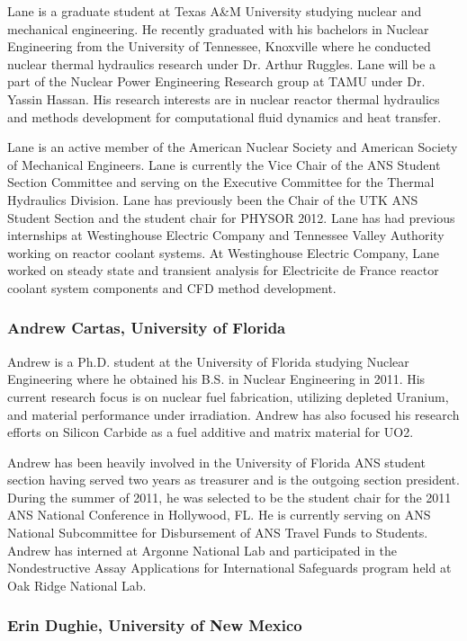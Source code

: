 Lane is a graduate student at Texas A\&M University studying nuclear and
mechanical engineering. He recently graduated with his bachelors in Nuclear
Engineering from the University of Tennessee, Knoxville where he conducted
nuclear thermal hydraulics research under Dr. Arthur Ruggles. Lane will be a
part of the Nuclear Power Engineering Research group at TAMU under Dr. Yassin
Hassan. His research interests are in nuclear reactor thermal hydraulics and
methods development for computational fluid dynamics and heat transfer.

Lane is an active member of the American Nuclear Society and American Society of
Mechanical Engineers. Lane is currently the Vice Chair of the ANS Student
Section Committee and serving on the Executive Committee for the Thermal
Hydraulics Division. Lane has previously been the Chair of the UTK ANS Student
Section and the student chair for PHYSOR 2012. Lane has had previous internships
at Westinghouse Electric Company and Tennessee Valley Authority working on
reactor coolant systems. At Westinghouse Electric Company, Lane worked on steady
state and transient analysis for Electricite de France reactor coolant system
components and CFD method development.

\subsubsection*{Andrew Cartas, University of Florida}

Andrew is a Ph.D. student at the University of Florida studying Nuclear
Engineering where he obtained his B.S. in Nuclear Engineering in 2011. His
current research focus is on nuclear fuel fabrication, utilizing depleted
Uranium, and material performance under irradiation. Andrew has also focused his
research efforts on Silicon Carbide as a fuel additive and matrix material for
UO2.

Andrew has been heavily involved in the University of Florida ANS student
section having served two years as treasurer and is the outgoing section
president. During the summer of 2011, he was selected to be the student chair
for the 2011 ANS National Conference in Hollywood, FL. He is currently serving
on ANS National Subcommittee for Disbursement of ANS Travel Funds to
Students. Andrew has interned at Argonne National Lab and participated in the
Nondestructive Assay Applications for International Safeguards program held at
Oak Ridge National Lab.

\subsubsection*{Erin Dughie, University of New Mexico}

